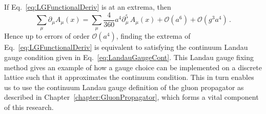 %
If Eq.~\eqref{eq:LGFunctionalDeriv} is at an extrema, then 
%
\begin{equation*}
\sum_\mu \partial_\mu A_\mu(x) = \sum_\mu \frac{4}{360}a^4 \partial_\mu^5\,A_\mu(x) + \mathcal{O}(a^6)+\mathcal{O}(g^3a^4)\, .
\end{equation*}
%
Hence up to errors of order $\mathcal{O}(a^4)$, finding the extrema of Eq.~\eqref{eq:LGFunctionalDeriv} is equivalent to satisfying the continuum Landau gauge condition given in Eq.~\eqref{eq:LandauGaugeCont}. This Landau gauge fixing method gives an example of how a gauge choice can be implemented on a discrete lattice such that it approximates the continuum condition. This in turn enables us to use the continuum Landau gauge definition of the gluon propagator as described in Chapter~\ref{chapter:GluonPropagator}, which forms a vital component of this research.
